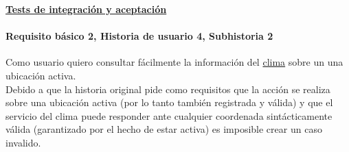 \documentclass[../ei103948-project-documentation.tex]{subfiles}
\begin{document}
							\begin{center}
								\textbf{\underline{Tests de integración y aceptación}}
							\end{center}
		
							\testBasicoP
				
							\vspace*{5mm}

					\paragraph*{Requisito básico 2, Historia de usuario 4, Subhistoria 2}
					Como usuario quiero consultar fácilmente la información del \underline{clima} sobre un una ubicación activa.\\

					Debido a que la historia original pide como requisitos que la acción se realiza sobre una ubicación activa (por lo tanto también registrada y válida) y que el servicio del clima puede responder ante cualquier coordenada sintácticamente válida (garantizado por el hecho de estar activa) es imposible crear un caso invalido.
\end{document}
